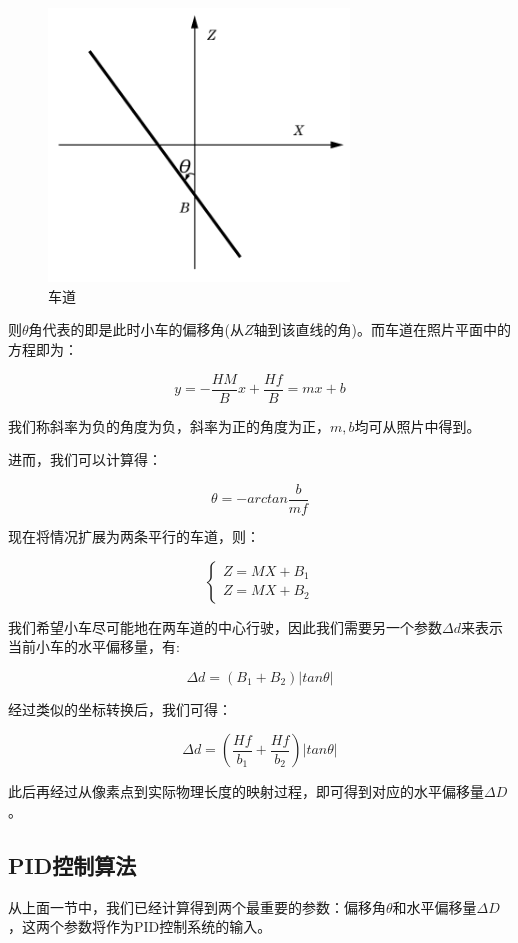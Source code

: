 \documentclass[11pt]{article}
\begin{document}
\begin{figure}[h!]
	\centering
	\includegraphics[width=8cm]{Graphs/lane}
	\caption{车道}
	\label{fig:lane}
\end{figure}

则$\theta$角代表的即是此时小车的偏移角(从$Z$轴到该直线的角)。而车道在照片平面中的方程即为：

$$
y = -\frac{HM}{B}x + \frac{Hf}{B} = mx + b
$$

我们称斜率为负的角度为负，斜率为正的角度为正，$m, b$均可从照片中得到。

进而，我们可以计算得：

$$
\theta = -arctan\frac{b}{mf}
$$

现在将情况扩展为两条平行的车道，则：

$$
\begin{cases}
Z = MX + B_1 \\
Z = MX + B_2
\end{cases}
$$

我们希望小车尽可能地在两车道的中心行驶，因此我们需要另一个参数$\Delta d$来表示当前小车的水平偏移量，有:

$$
\Delta d = (B_1 + B_2) \vert tan\theta \vert
$$

经过类似的坐标转换后，我们可得：

$$
\Delta d = (\frac{Hf}{b_1} + \frac{Hf}{b_2})\vert tan\theta \vert
$$

此后再经过从像素点到实际物理长度的映射过程，即可得到对应的水平偏移量$\Delta D$。

\subsection{PID控制算法}

从上面一节中，我们已经计算得到两个最重要的参数：偏移角$\theta$和水平偏移量$\Delta D$，这两个参数将作为PID控制系统的输入。
\end{document}
